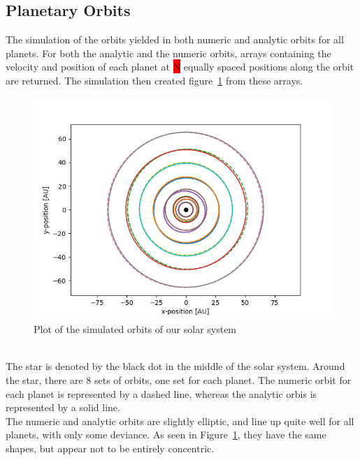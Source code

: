 \documentclass[reprint,english,notitlepage]{revtex4-2}
\begin{document}
\subsection{Planetary Orbits}
    The simulation of the orbits yielded in both numeric and analytic orbits for all planets.
	For both the analytic and the numeric orbits, arrays containing the velocity and position of each planet at \colorbox{red}{N} equally spaced positions along the orbit are returned.
	The simulation then created figure~\ref{fig:Orbit_Plot} from these arrays.
\begin{figure}[h]
	\centering
	\includegraphics[scale=0.4]{Figures/Orbit_plots}
	\caption{Plot of the simulated orbits of our solar system}\label{fig:Orbit_Plot}
\end{figure}\\
	The star is denoted by the black dot in the middle of the solar system.
	Around the star, there are 8 sets of orbits, one set for each planet.
	The numeric orbit for each planet is represented by a dashed line, whereas the analytic orbis is represented by a solid line.\\
	The numeric and analytic orbits are slightly elliptic, and line up quite well for all planets, with only some deviance.
	As seen in Figure~\ref{fig:Orbit_Plot}, they have the same shapes, but appear not to be entirely concentric.
\end{document}
